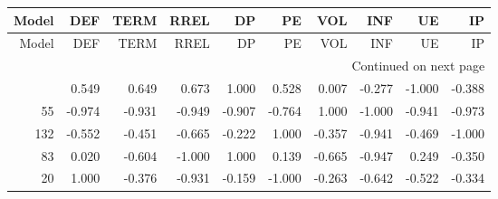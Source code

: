 \begin{longtable}{rrrrrrrrrr}
\label{tab:Importance_standardised_5}\\
\toprule
 Model &    DEF &   TERM &   RREL &     DP &     PE &    VOL &    INF &     UE &     IP \\
\midrule
\endfirsthead

\toprule
 Model &    DEF &   TERM &   RREL &     DP &     PE &    VOL &    INF &     UE &     IP \\
\midrule
\endhead
\midrule
\multicolumn{10}{r}{{Continued on next page}} \\
\midrule
\endfoot

\bottomrule
\endlastfoot
    23 &  0.549 &  0.649 &  0.673 &  1.000 &  0.528 &  0.007 & -0.277 & -1.000 & -0.388 \\
    55 & -0.974 & -0.931 & -0.949 & -0.907 & -0.764 &  1.000 & -1.000 & -0.941 & -0.973 \\
   132 & -0.552 & -0.451 & -0.665 & -0.222 &  1.000 & -0.357 & -0.941 & -0.469 & -1.000 \\
    83 &  0.020 & -0.604 & -1.000 &  1.000 &  0.139 & -0.665 & -0.947 &  0.249 & -0.350 \\
    20 &  1.000 & -0.376 & -0.931 & -0.159 & -1.000 & -0.263 & -0.642 & -0.522 & -0.334 \\
\end{longtable}
